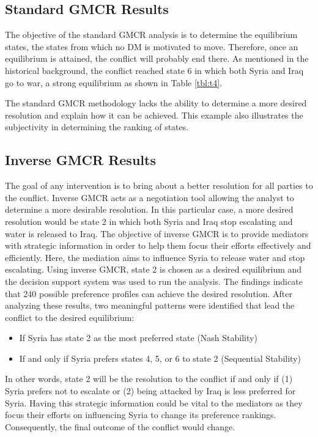 \documentclass[letterpaper,12pt,titlepage,oneside,final]{book}
\begin{document}
\subsection{Standard GMCR Results}
The objective of the standard GMCR analysis is to determine the equilibrium states, the states from which no DM is motivated to move. Therefore, once an equilibrium is attained, the conflict will probably end there. As mentioned in the historical background, the conflict reached state 6 in which both Syria and Iraq go to war, a strong equilibrium as shown in Table \ref{tbl:t4}. 

The standard GMCR methodology lacks the ability to determine a more desired resolution and explain how it can be achieved. This example also illustrates the subjectivity in determining the ranking of states. 

\subsection{Inverse GMCR Results}
The goal of any intervention is to bring about a better resolution for all parties to the conflict. Inverse GMCR acts as a negotiation tool allowing the analyst to determine a more desirable resolution. In this particular case, a more desired resolution would be state 2 in which both Syria and Iraq stop escalating and water is released to Iraq. The objective of inverse GMCR is to provide mediators with strategic information in order to help them focus their efforts effectively and efficiently. Here, the mediation aims to influence Syria to release water and stop escalating. Using inverse GMCR, state 2 is chosen as a desired equilibrium and the decision support system was used to run the analysis. The findings indicate that 240 possible preference profiles can achieve the desired resolution. After analyzing these results, two meaningful patterns were identified that lead the conflict to the desired equilibrium:
\begin{itemize}
\item If Syria has state 2 as the most preferred state (Nash Stability)
\item If and only if Syria prefers states 4, 5, or 6 to state 2 (Sequential Stability)
\end{itemize}

\noindent In other words, state 2 will be the resolution to the conflict if and only if (1) Syria prefers not to escalate or (2) being attacked by Iraq is less preferred for Syria. Having this strategic information could be vital to the mediators as they focus their efforts on influencing Syria to change its preference rankings. Consequently, the final outcome of the conflict would change.
\end{document}

